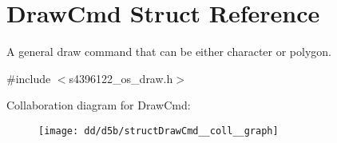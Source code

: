 \hypertarget{structDrawCmd}{}\section{Draw\+Cmd Struct Reference}
\label{structDrawCmd}


A general draw command that can be either character or polygon.  




{\ttfamily \#include $<$s4396122\+\_\+os\+\_\+draw.\+h$>$}



Collaboration diagram for Draw\+Cmd\+:\nopagebreak
\begin{figure}[H]
\begin{center}
\leavevmode
\texttt{[image: dd/d5b/structDrawCmd\_\_coll\_\_graph]}
\end{center}
\end{figure}

